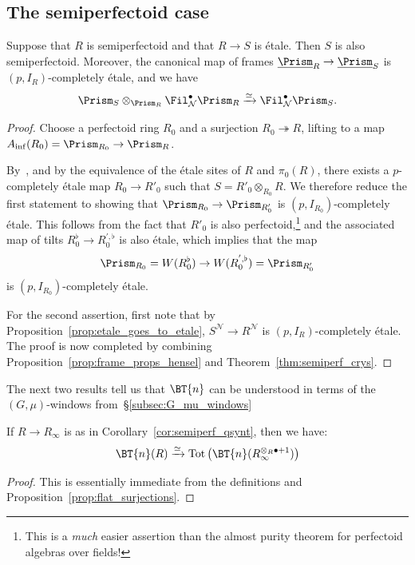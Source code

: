 \documentclass[10pt]{amsart}
\begin{document}
\subsection{The semiperfectoid case}
\label{subsec:semiperfectoid}
\begin{lemma}
\label{lem:f-semiperf_etale}
Suppose that $R$ is semiperfectoid and that $R\to S$ is \'etale. Then $S$ is also semiperfectoid. Moreover, the canonical map of frames $\underline{\Prism}_R\to \underline{\Prism}_S$ is $(p,I_R)$-completely \'etale, and we have
\[
\Prism_S\otimes_{\Prism_R}\Fil^\bullet_{\mathcal{N}}\Prism_R\xrightarrow{\simeq}\Fil^\bullet_{\mathcal{N}}\Prism_S.
\]
\end{lemma}
\begin{proof}
Choose a perfectoid ring $R_0$ and a surjection $R_0\twoheadrightarrow R$, lifting to a map $A_{\mathrm{inf}}(R_0)=\Prism_{R_0}\to \Prism_R$.

By~\cite[\href{https://stacks.math.columbia.edu/tag/04D1}{Tag 04D1}]{stacks-project}, and by the equivalence of the \'etale sites of $R$ and $\pi_0(R)$, there exists a $p$-completely \'etale map $R_0\to R'_0$ such that $S = R'_0\otimes_{R_0}R$. We therefore reduce the first statement to showing that $\Prism_{R_0}\to\Prism_{R'_0}$ is $(p,I_{R_0})$-completely \'etale. This follows from the fact that $R'_0$ is also perfectoid,\footnote{This is a \emph{much} easier assertion than the almost purity theorem for perfectoid algebras over fields!} and the associated map of tilts $R_0^\flat\to R_0^{',\flat}$ is also \'etale, which implies that the map 
\[
\Prism_{R_0} = W(R_0^\flat)\to W(R^{',\flat}_0) = \Prism_{R'_0}
\]
is $(p,I_{R_0})$-completely \'etale.

For the second assertion, first note that by Proposition~\ref{prop:etale_goes_to_etale}, $S^{\mathcal{N}}\to R^{\mathcal{N}}$ is $(p,I_R)$-completely \'etale. The proof is now completed by combining Proposition~\ref{prop:frame_props_hensel} and Theorem~\ref{thm:semiperf_crys}.
\end{proof}



The next two results tell us that $\BT{n}$ can be understood in terms of the $(G,\mu)$-windows from~\S\ref{subsec:G_mu_windows}


\begin{proposition}
\label{prop:descent}
If $R\to R_{\infty}$ is as in Corollary~\ref{cor:semiperf_qsynt}, then we have:
\[
\BT{n}(R)\xrightarrow{\simeq}\mathrm{Tot}\left(\BT{n}(R_\infty^{\otimes_R \bullet+1})\right)
\]
\end{proposition}
\begin{proof}
This is essentially immediate from the definitions and Proposition~\ref{prop:flat_surjections}. 
\end{proof}
\end{document}
